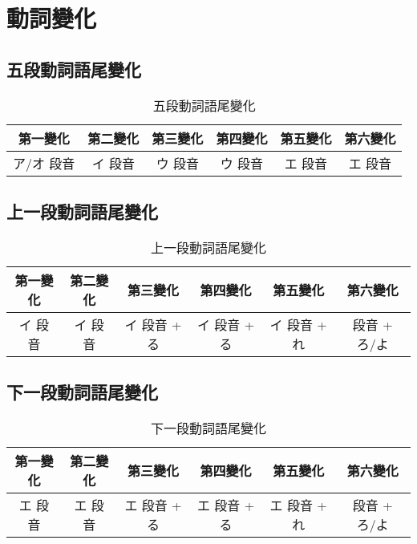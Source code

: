 \documentclass[12pt]{article}
\begin{document}
\begin{CJK}{UTF8}{cwku}
\begin{table}[htdp]
\begin{tabular}{cccccccccc}
\hline
\end{tabular}
\end{table}

\section{動詞變化}

\subsection{五段動詞語尾變化}
\begin{table}[htdp]
\begin{tabular}{cccccc}
\hline
第一變化 & 第二變化 & 第三變化 & 第四變化 & 第五變化 & 第六變化 \\
\hline
ア/オ 段音 & イ 段音 & ウ 段音 & ウ 段音  & エ 段音 & エ 段音  \\
\hline
\end{tabular}
\caption{五段動詞語尾變化}
\end{table}

\subsection{上一段動詞語尾變化}
\begin{table}[htdp]
\begin{tabular}{cccccc}
\hline
第一變化 & 第二變化 & 第三變化 & 第四變化 & 第五變化 & 第六變化 \\
\hline
イ 段音 & イ 段音 & イ 段音 + る &  イ 段音 + る &  イ 段音 + れ &  段音 + ろ/よ \\
\hline
\end{tabular}
\caption{上一段動詞語尾變化}
\end{table}

\subsection{下一段動詞語尾變化}
\begin{table}[htdp]
\begin{tabular}{cccccc}
\hline
第一變化 & 第二變化 & 第三變化 & 第四變化 & 第五變化 & 第六變化 \\
\hline
エ 段音 & エ 段音 & エ 段音 + る &  エ 段音 + る &  エ 段音 + れ &  段音 + ろ/よ \\
\hline
\end{tabular}
\caption{下一段動詞語尾變化}
\end{table}


\end{CJK}
\end{document}
